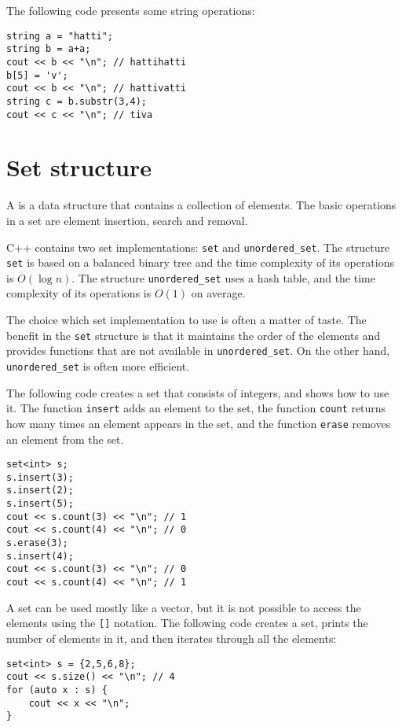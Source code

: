 The following code presents some string operations:

\begin{lstlisting}
string a = "hatti";
string b = a+a;
cout << b << "\n"; // hattihatti
b[5] = 'v';
cout << b << "\n"; // hattivatti
string c = b.substr(3,4);
cout << c << "\n"; // tiva
\end{lstlisting}

\section{Set structure}


A  is a data structure that
contains a collection of elements.
The basic operations in a set are element
insertion, search and removal.

C++ contains two set implementations:
\texttt{set} and \texttt{unordered\_set}.
The structure \texttt{set} is based on a balanced
binary tree and the time complexity of its
operations is $O(\log n)$.
The structure \texttt{unordered\_set} uses a hash table,
and the time complexity of its operations is $O(1)$ on average.

The choice which set implementation to use
is often a matter of taste.
The benefit in the \texttt{set} structure
is that it maintains the order of the elements
and provides functions that are not available
in \texttt{unordered\_set}.
On the other hand, \texttt{unordered\_set} is
often more efficient.

The following code creates a set
that consists of integers,
and shows how to use it.
The function \texttt{insert} adds an element to the set,
the function \texttt{count} returns how many times an
element appears in the set,
and the function \texttt{erase} removes an element from the set.

\begin{lstlisting}
set<int> s;
s.insert(3);
s.insert(2);
s.insert(5);
cout << s.count(3) << "\n"; // 1
cout << s.count(4) << "\n"; // 0
s.erase(3);
s.insert(4);
cout << s.count(3) << "\n"; // 0
cout << s.count(4) << "\n"; // 1
\end{lstlisting}

A set can be used mostly like a vector,
but it is not possible to access
the elements using the \texttt{[]} notation.
The following code creates a set,
prints the number of elements in it, and then
iterates through all the elements:
\begin{lstlisting}
set<int> s = {2,5,6,8};
cout << s.size() << "\n"; // 4
for (auto x : s) {
    cout << x << "\n";
}
\end{lstlisting}

